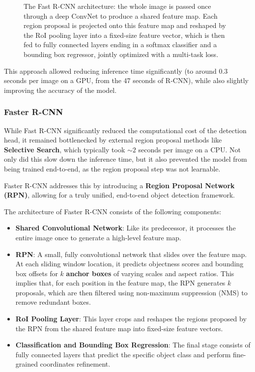 \begin{figure}[H]
    \centering
    \resizebox{\textwidth}{!}{}
    \caption{The Fast R-CNN architecture: the whole image is passed once through a deep ConvNet to produce a shared feature map. Each region proposal is projected onto this feature map and reshaped by the RoI pooling layer into a fixed-size feature vector, which is then fed to fully connected layers ending in a softmax classifier and a bounding box regressor, jointly optimized with a multi-task loss.}
    \label{fig:fast-rcnn-architecture}
\end{figure}

This approach allowed reducing inference time significantly (to around 0.3 seconds per image on a GPU, from the 47 seconds of R-CNN), while also slightly improving the accuracy of the model.

\subsubsection{Faster R-CNN}
While Fast R-CNN significantly reduced the computational cost of the detection head, it remained bottlenecked by external region proposal 
methods like \textbf{Selective Search}, which typically took $\sim 2$ seconds per image on a CPU. 
Not only did this slow down the inference time, but it also prevented the model from being trained end-to-end, as the region proposal step was not learnable.

Faster R-CNN addresses this by introducing a \textbf{Region Proposal Network (RPN)}, allowing for a truly unified, end-to-end object detection framework.

The architecture of Faster R-CNN consists of the following components:
\begin{itemize}
    \item \textbf{Shared Convolutional Network}: Like its predecessor, it processes the entire image once to generate a high-level feature map.
    
    \item \textbf{RPN}: A small, fully convolutional network that slides over the feature map.
    At each sliding window location, it predicts objectness scores and bounding box offsets for $k$ \textbf{anchor boxes} of varying scales and aspect ratios.
    This implies that, for each position in the feature map, the RPN generates $k$ proposals, which are then filtered using non-maximum suppression (NMS) to remove redundant boxes.
    
    \item \textbf{RoI Pooling Layer}: This layer crops and reshapes the regions proposed by the RPN from the shared feature map into fixed-size feature vectors.
    
    \item \textbf{Classification and Bounding Box Regression}: The final stage consists of fully connected layers that predict the specific object class and perform fine-grained coordinates refinement.
\end{itemize}

